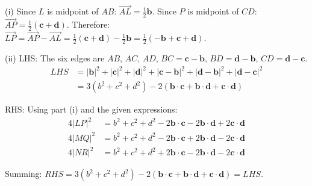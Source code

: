 \begin{solution}[Sketch]
(i) Since $L$ is midpoint of $AB$: $\overrightarrow{AL} = \frac{1}{2}\mathbf{b}$. Since $P$ is midpoint of $CD$: $\overrightarrow{AP} = \frac{1}{2}(\mathbf{c} + \mathbf{d})$. Therefore: $\overrightarrow{LP} = \overrightarrow{AP} - \overrightarrow{AL} = \frac{1}{2}(\mathbf{c} + \mathbf{d}) - \frac{1}{2}\mathbf{b} = \frac{1}{2}(-\mathbf{b} + \mathbf{c} + \mathbf{d})$.

(ii) LHS: The six edges are $AB$, $AC$, $AD$, $BC = \mathbf{c}-\mathbf{b}$, $BD = \mathbf{d}-\mathbf{b}$, $CD = \mathbf{d}-\mathbf{c}$.
\begin{align*}
LHS &= |\mathbf{b}|^2 + |\mathbf{c}|^2 + |\mathbf{d}|^2 + |\mathbf{c}-\mathbf{b}|^2 + |\mathbf{d}-\mathbf{b}|^2 + |\mathbf{d}-\mathbf{c}|^2 \\
&= 3(b^2 + c^2 + d^2) - 2(\mathbf{b}\cdot\mathbf{c} + \mathbf{b}\cdot\mathbf{d} + \mathbf{c}\cdot\mathbf{d})
\end{align*}

RHS: Using part (i) and the given expressions:
\begin{align*}
4|LP|^2 &= b^2 + c^2 + d^2 - 2\mathbf{b}\cdot\mathbf{c} - 2\mathbf{b}\cdot\mathbf{d} + 2\mathbf{c}\cdot\mathbf{d} \\
4|MQ|^2 &= b^2 + c^2 + d^2 - 2\mathbf{b}\cdot\mathbf{c} + 2\mathbf{b}\cdot\mathbf{d} - 2\mathbf{c}\cdot\mathbf{d} \\
4|NR|^2 &= b^2 + c^2 + d^2 + 2\mathbf{b}\cdot\mathbf{c} - 2\mathbf{b}\cdot\mathbf{d} - 2\mathbf{c}\cdot\mathbf{d}
\end{align*}

Summing: $RHS = 3(b^2 + c^2 + d^2) - 2(\mathbf{b}\cdot\mathbf{c} + \mathbf{b}\cdot\mathbf{d} + \mathbf{c}\cdot\mathbf{d}) = LHS$.
\end{solution}

